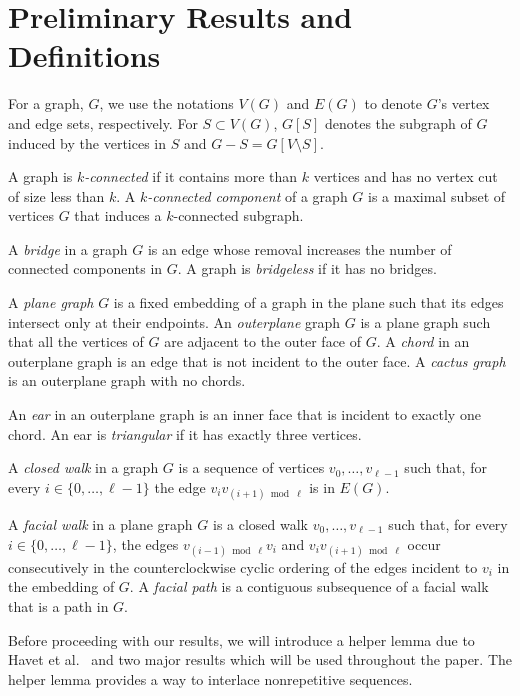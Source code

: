 \documentclass{patmorin}
\begin{document}
\section{Preliminary Results and Definitions}

For a graph, $G$, we use the notations $V(G)$ and $E(G)$ to denote $G$'s vertex and edge sets, respectively. For $S\subset V(G)$, $G[S]$ denotes the subgraph of $G$ induced by the vertices in $S$ and $G-S=G[V\setminus S]$.

A graph is \emph{$k$-connected} if it contains more than $k$ vertices and has
no vertex cut of size less than $k$.  A \emph{$k$-connected component} of a graph $G$ is a maximal subset of vertices $G$ that induces a $k$-connected subgraph.

A \emph{bridge} in a graph $G$ is an edge whose removal increases the number of connected components in $G$.  A graph is \emph{bridgeless} if it has no bridges.

A \emph{plane graph} $G$ is a fixed embedding of a graph in the plane such
that its edges intersect only at their endpoints. An \emph{outerplane}
graph $G$ is a plane graph such that all the vertices of $G$ are adjacent
to the outer face of $G$. A \emph{chord} in an outerplane graph is
an edge that is not incident to the outer face. A \emph{cactus graph}
is an outerplane graph with no chords.

An \emph{ear} in an outerplane graph is an inner face that is incident to
exactly one chord. An ear is \emph{triangular} if it has exactly three vertices.

A \emph{closed walk} in a graph $G$ is a sequence of vertices
$v_0,\ldots,v_{\ell-1}$ such that, for every $i\in\{0,\ldots,\ell-1\}$
the edge $v_iv_{(i+1)\bmod \ell}$ is in $E(G)$.

A \emph{facial walk} in a plane graph $G$ is a closed walk
$v_0,\ldots,v_{\ell-1}$ such that, for every $i\in\{0,\ldots,\ell-1\}$,
the edges $v_{(i-1)\bmod \ell} v_i$ and $v_iv_{(i+1)\bmod\ell}$ occur
consecutively in the counterclockwise cyclic ordering of the edges
incident to $v_i$ in the embedding of $G$.  A \emph{facial path} is a
contiguous subsequence of a facial walk that is a path in $G$.

Before proceeding with our results, we will introduce a helper lemma
due to Havet et al.~\cite{havet2011facial} and two major results which
will be used throughout the paper. The helper lemma provides a way to
interlace nonrepetitive sequences.
\end{document}
